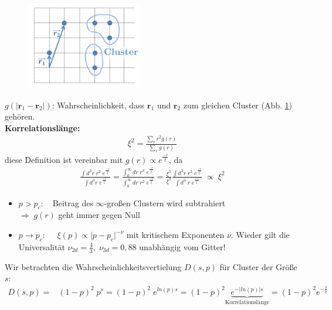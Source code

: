 \documentclass[12pt]{article}
\begin{document}
 	\begin{figure}[ht]
\centering
\includegraphics[width=0.45\textwidth]{Folie49.png}
	\caption{}
	\label{fig:Korrelationsfunktion}
\end{figure}

 	 $g( \vert \mathbf{r}_1 - \mathbf{r}_2 \vert)$: Wahrscheinlichkeit, dass $\mathbf{r}_1$ und $\mathbf{r}_2$ zum gleichen Cluster (Abb. \ref{fig:Korrelationsfunktion}) gehören. \\
 	\textbf{Korrelationslänge:}
 	 \begin{align}
 	\xi^2= \frac{\sum_r r^2 g(r)}{\sum_r g(r)}
 	\end{align}
 	diese Definition ist vereinbar mit $g(r) \propto e^\frac{-r}{\xi}$, da 
 	\begin{align}
 	\frac{\int d^3r \; r^2 \; e^\frac{-r}{\xi}}{\int d^3 r \; e^\frac{-r}{\xi}}
 	= \frac{\int_0^\infty dr \; r^4 \; e^\frac{-r}{\xi}}{\int_0^\infty d r \; r^2 \; e^\frac{-r}{\xi}}
 	= \frac{\xi^5}{\xi^3}  \frac{\int d^3r \; r^2 \; e^\frac{-r}{\xi}}{\int d^3\;  r \; e^\frac{-r}{\xi}} \; \propto \; \xi^2
 	\end{align}
 	
 	\begin{itemize}
 	\item $p>p_c: \quad$Beitrag des $\infty$-großen Clustern wird subtrahiert \\ $\Rightarrow \; g(r)$ geht immer gegen Null
 	\item $p \to p_c: \quad $ $\xi(p) \propto \vert p-p_c \vert^{-\nu}$ mit kritischem Exponenten $\nu$. Wieder gilt die Universalität $\nu_{2d} = \frac{4}{3}, \; \nu_{3d} = 0,88$ unabhängig vom Gitter!
 	
 	\end{itemize}

 	 	Wir betrachten die Wahrscheinlichkeitsvertielung $D(s,p)$ für Cluster der Größe $s$: 
\begin{align}
 	D(s,p)=& (1-p)^2 \; p^s
 	= (1-p)^2 \; e^{ln(p)s} = (1-p)^2 \underbrace{e^{- \vert ln(p) \vert s}}_\text{Korrelationslänge} = (1-p)^2 e^{-\frac{s}{\xi}}
\end{align}
\end{document}
